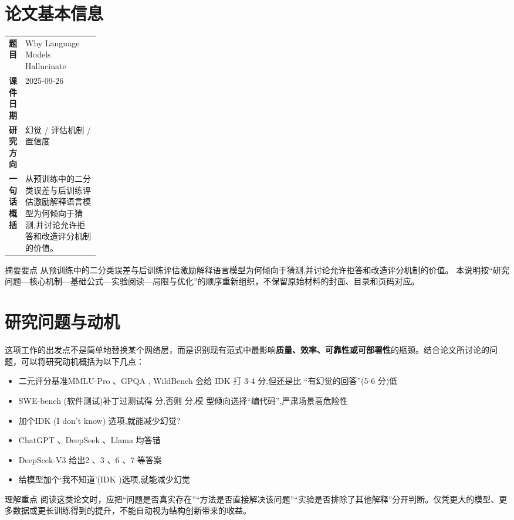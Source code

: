 \documentclass[UTF8,11pt,a4paper]{ctexart}
\newcommand{\term}[1]{\textbf{\textcolor{mainblue}{#1}}}
\begin{document}
\section{论文基本信息}
\begin{center}
\begin{tabularx}{0.94\linewidth}{>{\bfseries}p{0.18\linewidth}X}
\toprule
题目 & Why Language Models Hallucinate\\
课件日期 & 2025-09-26\\
研究方向 & 幻觉 / 评估机制 / 置信度\\
一句话概括 & 从预训练中的二分类误差与后训练评估激励解释语言模型为何倾向于猜测,并讨论允许拒答和改造评分机制的价值。\\
\bottomrule
\end{tabularx}
\end{center}

\begin{infobox}{摘要要点}
从预训练中的二分类误差与后训练评估激励解释语言模型为何倾向于猜测,并讨论允许拒答和改造评分机制的价值。 本说明按“研究问题—核心机制—基础公式—实验阅读—局限与优化”的顺序重新组织，不保留原始材料的封面、目录和页码对应。
\end{infobox}

\section{研究问题与动机}
这项工作的出发点不是简单地替换某个网络层，而是识别现有范式中最影响\term{质量、效率、可靠性或可部署性}的瓶颈。结合论文所讨论的问题，可以将研究动机概括为以下几点：
\begin{itemize}
\item 二元评分基准MMLU-Pro 、GPQA , WildBench 会给 IDK 打 3-4 分,但还是比 “有幻觉的回答”(5-6 分)低
\item SWE-bench (软件测试)补丁过测试得 分,否则 分,模 型倾向选择“编代码”,严肃场景高危险性
\item 加个IDK (I don't know) 选项,就能减少幻觉?
\item ChatGPT 、DeepSeek 、Llama 均答错
\item DeepSeek-V3 给出2 、3 、6 、7 等答案
\item 给模型加个‘我不知道’(IDK )选项,就能减少幻觉
\end{itemize}

\begin{notebox}{理解重点}
阅读这类论文时，应把“问题是否真实存在”“方法是否直接解决该问题”“实验是否排除了其他解释”分开判断。仅凭更大的模型、更多数据或更长训练得到的提升，不能自动视为结构创新带来的收益。
\end{notebox}
\end{document}
